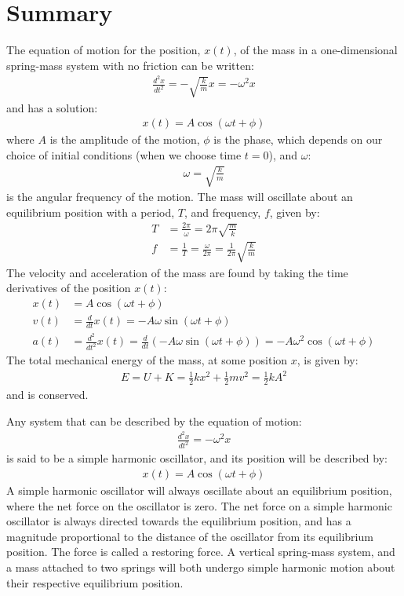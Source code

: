 \section{Summary}
\begin{chapterSummary}
The equation of motion for the position, $x(t)$, of the mass in a one-dimensional spring-mass system with no friction can be written:
\begin{align*}
\frac{d^2x}{dt^2}=-\sqrt{\frac{k}{m}}x = -\omega^2 x
\end{align*}
and has a solution:
\begin{align*}
x(t) = A\cos(\omega t + \phi)
\end{align*}
where $A$ is the amplitude of the motion, $\phi$ is the phase, which depends on our choice of initial conditions (when we choose time $t=0$), and $\omega$:
\begin{align*}
\omega = \sqrt{\frac{k}{m}}
\end{align*}
is the angular frequency of the motion. The mass will oscillate about an equilibrium position with a period, $T$, and frequency, $f$, given by:
\begin{align*}
T&=\frac{2\pi}{\omega}=2\pi\sqrt{\frac{m}{k}}\\
f&=\frac{1}{T}=\frac{\omega}{2\pi}=\frac{1}{2\pi}\sqrt{\frac{k}{m}}
\end{align*}
The velocity and acceleration of the mass are found by taking the time derivatives of the position $x(t)$:
\begin{align*}
x(t)&= A \cos(\omega t + \phi)\\
v(t)&=\frac{d}{dt}x(t) = -A\omega\sin(\omega t + \phi)\\
a(t)&= \frac{d^2}{dt^2}x(t) =\frac{d}{dt}\left( -A\omega\sin(\omega t + \phi)\right)= -A\omega^2\cos(\omega t + \phi)
\end{align*}
The total mechanical energy of the mass, at some position $x$, is given by:
\begin{align*}
E =U+K=\frac{1}{2}kx^2+\frac{1}{2}mv^2= \frac{1}{2}kA^2
\end{align*}
and is conserved. 

Any system that can be described by the equation of motion:
\begin{align*}
\frac{d^2x}{dt^2}= -\omega^2 x
\end{align*}
is said to be a simple harmonic oscillator, and its position will be described by:
\begin{align*}
x(t) = A\cos(\omega t + \phi)
\end{align*}
A simple harmonic oscillator will always oscillate about an equilibrium position, where the net force on the oscillator is zero. The net force on a simple harmonic oscillator is always directed towards the equilibrium position, and has a magnitude proportional to the distance of the oscillator from its equilibrium position. The force is called a restoring force. A vertical spring-mass system, and a mass attached to two springs will both undergo simple harmonic motion about their respective equilibrium position.


\end{chapterSummary}
